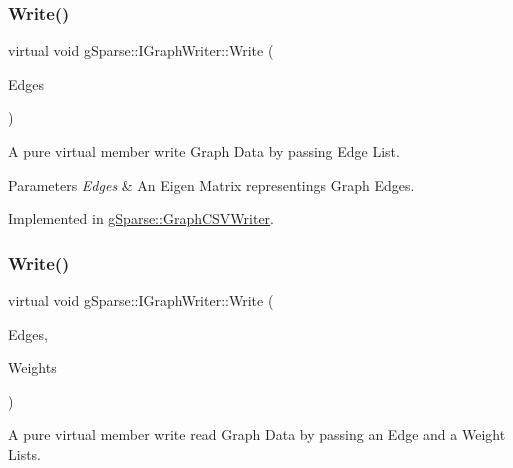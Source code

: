 \subsubsection{\texorpdfstring{Write()}{Write()}\hspace{0.1cm}{\footnotesize\ttfamily [2/3]}}
{\footnotesize\ttfamily virtual void g\+Sparse\+::\+I\+Graph\+Writer\+::\+Write (\begin{DoxyParamCaption}\item[{const g\+Sparse\+::\+Edge\+Matrix \&}]{Edges }\end{DoxyParamCaption})\hspace{0.3cm}{\ttfamily [pure virtual]}}



A pure virtual member write Graph Data by passing Edge List. 


\begin{DoxyParams}{Parameters}
{\em Edges} & An Eigen Matrix representings Graph Edges. \\
\hline
\end{DoxyParams}


Implemented in \mbox{\hyperlink{classg_sparse_1_1_graph_c_s_v_writer_a83598d104e12327bf819928239e18ca3}{g\+Sparse\+::\+Graph\+C\+S\+V\+Writer}}.

\mbox{\label{classg_sparse_1_1_i_graph_writer_ae2c720f3e37629da40fdc5d0e4fe2dd2}} 
\subsubsection{\texorpdfstring{Write()}{Write()}\hspace{0.1cm}{\footnotesize\ttfamily [3/3]}}
{\footnotesize\ttfamily virtual void g\+Sparse\+::\+I\+Graph\+Writer\+::\+Write (\begin{DoxyParamCaption}\item[{const g\+Sparse\+::\+Edge\+Matrix \&}]{Edges,  }\item[{const g\+Sparse\+::\+Precision\+Row\+Matrix \&}]{Weights }\end{DoxyParamCaption})\hspace{0.3cm}{\ttfamily [pure virtual]}}



A pure virtual member write read Graph Data by passing an Edge and a Weight Lists. 


